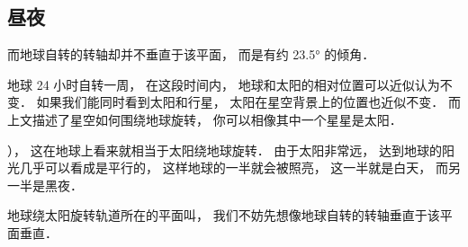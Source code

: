 \subsection{昼夜}




而地球自转的转轴却并不垂直于该平面， 而是有约 23.5° 的倾角．



地球 24 小时自转一周， 在这段时间内， 地球和太阳的相对位置可以近似认为不变． 如果我们能同时看到太阳和行星， 太阳在星空背景上的位置也近似不变． 而上文描述了星空如何围绕地球旋转， 你可以相像其中一个星星是太阳．



）， 这在地球上看来就相当于太阳绕地球旋转． 由于太阳非常远， 达到地球的阳光几乎可以看成是平行的， 这样地球的一半就会被照亮， 这一半就是白天， 而另一半是黑夜．

地球绕太阳旋转轨道所在的平面叫， 我们不妨先想像地球自转的转轴垂直于该平面垂直． 












